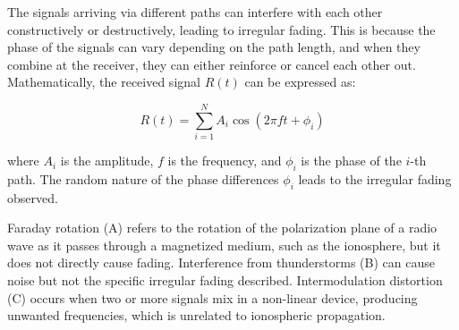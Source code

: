 The signals arriving via different paths can interfere with each other constructively or destructively, leading to irregular fading. This is because the phase of the signals can vary depending on the path length, and when they combine at the receiver, they can either reinforce or cancel each other out. Mathematically, the received signal \( R(t) \) can be expressed as:

\[ R(t) = \sum_{i=1}^{N} A_i \cos(2\pi f t + \phi_i) \]

where \( A_i \) is the amplitude, \( f \) is the frequency, and \( \phi_i \) is the phase of the \( i \)-th path. The random nature of the phase differences \( \phi_i \) leads to the irregular fading observed.

Faraday rotation (A) refers to the rotation of the polarization plane of a radio wave as it passes through a magnetized medium, such as the ionosphere, but it does not directly cause fading. Interference from thunderstorms (B) can cause noise but not the specific irregular fading described. Intermodulation distortion (C) occurs when two or more signals mix in a non-linear device, producing unwanted frequencies, which is unrelated to ionospheric propagation.

